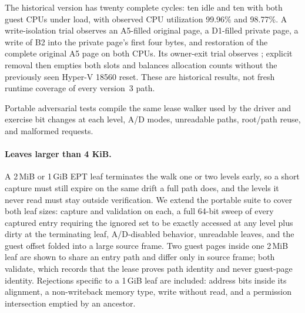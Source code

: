 \begin{table}[tbp]
\centering\small
\caption{Current page-control timing for three complete two-vCPU cycles.
Drain times are contained within their corresponding control bodies.}
\label{tab:lifecycle-times}

\end{table}

The historical version has twenty complete cycles: ten idle and ten with both
guest CPUs under load, with observed CPU utilization 99.96\% and 98.77\%.
A write-isolation trial observes an A5-filled original page, a D1-filled private
page, a write of B2 into the private page's first four bytes, and restoration of
the complete original A5 page on both CPUs. Its owner-exit trial observes
; explicit removal then empties both
slots and balances allocation counts without the previously seen Hyper-V
18560 reset. These are historical results, not fresh runtime coverage of every
version~3 path.

Portable adversarial tests compile the same lease walker used by the driver and
exercise bit changes at each level, A/D modes, unreadable paths, root/path reuse,
and malformed requests.

\paragraph{Leaves larger than 4 KiB.}
A 2\,MiB or 1\,GiB EPT leaf terminates the walk one or two levels early, so a
short capture must still expire on the same drift a full path does, and the
levels it never read must stay outside verification. We extend the portable
suite to cover both leaf sizes: capture and validation on each, a full 64-bit
sweep of every captured entry requiring the ignored set to be exactly accessed at
any level plus dirty at the terminating leaf, A/D-disabled behavior, unreadable
leaves, and the guest offset folded into a large source frame. Two guest pages
inside one 2\,MiB leaf are shown to share an entry path and differ only in source
frame; both validate, which records that the lease proves path identity and never
guest-page identity. Rejections specific to a 1\,GiB leaf are included: address
bits inside its alignment, a non-writeback memory type, write without read, and a
permission intersection emptied by an ancestor.

